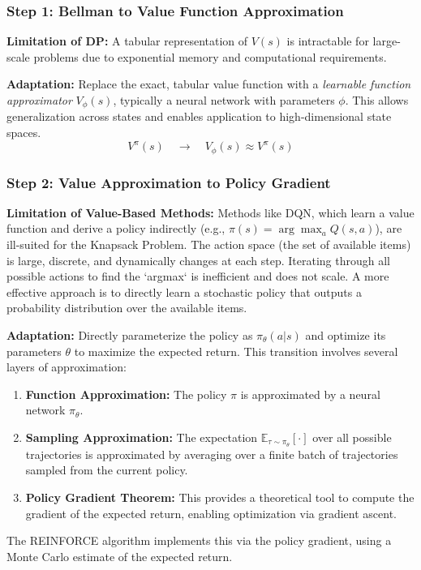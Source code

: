 \subsubsection{Step 1: Bellman to Value Function Approximation}
\textbf{Limitation of DP:} A tabular representation of \(V(s)\) is intractable for large-scale problems due to exponential memory and computational requirements.

\textbf{Adaptation:} Replace the exact, tabular value function with a \textit{learnable function approximator} \(V_\phi(s)\), typically a neural network with parameters \(\phi\). This allows generalization across states and enables application to high-dimensional state spaces.
\[
V^\pi(s) \quad \longrightarrow \quad V_\phi(s) \approx V^\pi(s)
\]

\subsubsection{Step 2: Value Approximation to Policy Gradient}
\textbf{Limitation of Value-Based Methods:} Methods like DQN, which learn a value function and derive a policy indirectly (e.g., \(\pi(s) = \arg\max_a Q(s,a)\)), are ill-suited for the Knapsack Problem. The action space (the set of available items) is large, discrete, and dynamically changes at each step. Iterating through all possible actions to find the `argmax` is inefficient and does not scale. A more effective approach is to directly learn a stochastic policy that outputs a probability distribution over the available items.

\textbf{Adaptation:} Directly parameterize the policy as \(\pi_\theta(a|s)\) and optimize its parameters \(\theta\) to maximize the expected return. This transition involves several layers of approximation:
\begin{enumerate}
    \item \textbf{Function Approximation:} The policy \(\pi\) is approximated by a neural network \(\pi_\theta\).
    \item \textbf{Sampling Approximation:} The expectation \(\mathbb{E}_{\tau \sim \pi_\theta}[\cdot]\) over all possible trajectories is approximated by averaging over a finite batch of trajectories sampled from the current policy.
    \item \textbf{Policy Gradient Theorem:} This provides a theoretical tool to compute the gradient of the expected return, enabling optimization via gradient ascent.
\end{enumerate}
The REINFORCE algorithm implements this via the policy gradient, using a Monte Carlo estimate of the expected return.

